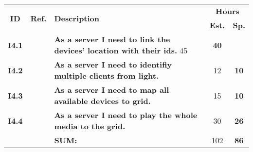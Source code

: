   \label{tab:sprint4stories}
 \def\arraystretch{1.25}
 
\begin{longtable}{ccXcc}

\toprule[0.5mm]
\multirow{2}{*}{\textbf{ID}} &
\multirow{2}{*}{\textbf{Ref.}} & \multirow{2}{*}{\textbf{Description}} & \multicolumn{2}{c}{\textbf{Hours}} \\
 					& & & \textbf{Est.} & \textbf{Sp.} \\
\midrule
\textbf{I4.1} 	& 	& {\bf As a server I need to link the devices' location with their ids.}	 45	& \textbf{40} \\

\textbf{I4.2} 	& 	& {\bf As a server I need to identifiy multiple clients from light.}	&    12	& \textbf{10} \\

\textbf{I4.3} 	& 	& {\bf As a server I need to map all available devices to grid.} 	& 15 & \textbf{10} \\	

\textbf{I4.4} 	& 	& {\bf As a server I need to play the whole media to the grid.} 	& 30 & \textbf{26} \\
	
\midrule
		
				&& \textbf{SUM:}		&		102	& \textbf{86}
 \\																			
\bottomrule[0.5mm]
\end{longtable}
